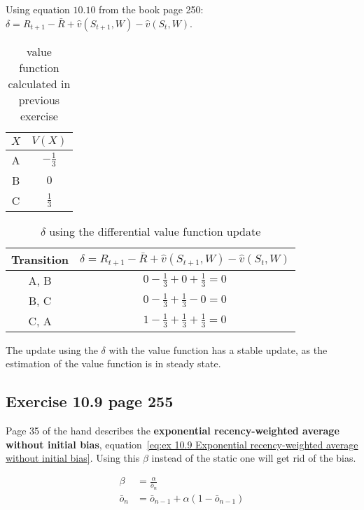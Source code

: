 Using equation $10.10$ from the book page 250: $\delta = R_{t+1} - \bar{R} + \hat{v}(S_{t+1}, W) - \hat{v}(S_t, W)$.

\begin{table}[H]
\begin{center}
	\begin{tabular}{c | c}
		$X$ & $V(X)$ \\
		\hline
		A & $-\frac{1}{3}$ \\
		B & $0$ \\
		C & $ \frac{1}{3}$ \\
	\end{tabular}
\end{center}
\label{tab:value function evaluated in previous exercise}	
\caption{value function calculated in previous exercise}
\end{table}

\begin{table}[H]
\begin{center}
	\begin{tabular}{c | c}
		Transition & $\delta = R_{t+1} - \bar{R} + \hat{v}(S_{t+1}, W) - \hat{v}(S_t, W)$ \\
		\hline
		A, B & $0 - \frac{1}{3} + 0 + \frac{1}{3} = 0$ \\
		B, C & $0 - \frac{1}{3} + \frac{1}{3} - 0 = 0$ \\
		C, A & $1 - \frac{1}{3} + \frac{1}{3} + \frac{1}{3}=0$ \\
	\end{tabular}
	\caption{$\delta$ using the differential value function update}
\end{center}
\end{table}

The update using the $\delta$ with the value function has a stable update, as the estimation of the value function is in steady state.

\subsection{Exercise 10.9 page 255}
Page 35 of the hand describes the \textbf{exponential recency-weighted average without initial bias}, equation~\ref{eq:ex 10.9 Exponential recency-weighted average without initial bias}. Using this $\beta$ instead of the static one will get rid of the bias.

\begin{equation}
\begin{split}
\beta & = \frac{\alpha}{\bar{o}_n} \\
\bar{o}_n & = \bar{o}_{n-1} + \alpha (1-\bar{o}_{n-1})
\end{split}
\label{eq:ex 10.9 Exponential recency-weighted average without initial bias}
\end{equation}